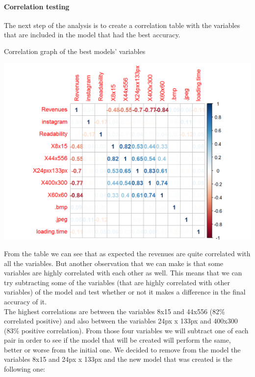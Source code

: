 \documentclass{article}
\begin{document}
\paragraph{Correlation testing}
The next step of the analysis is to create a correlation table with the variables that are included in the model that had the best accuracy.\\
\begin{table}[H]
\centering
\caption{Correlation graph of the best models' variables}
\begin{center}
\includegraphics[scale=0.5]{../R/photos/86_model_cor.png}     \\
\end{center}
\end{table}
From the table we can see that as expected the revenues are quite correlated with all the variables. But another observation that we can make is that some variables are highly correlated with each other as well. This means that we can try subtracting some of the variables (that are highly correlated with other variables) of the model and test whether or not it makes a difference in the final accuracy of it.\\
The highest correlations are between the variables 8x15 and 44x556 (82\% correlated positive) and also between the variables 24px x 133px and 400x300 (83\% positive correlation). From those four variables we will subtract one of each pair in order to see if the model that will be created will perform the same, better or worse from the initial one. We decided to remove from the model the variables 8x15 and 24px x 133px and the new model that was created is the following one:
\end{document}

